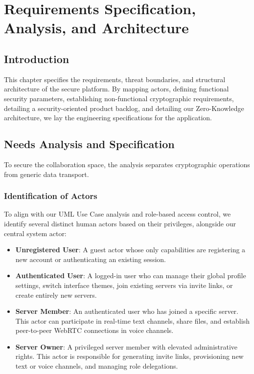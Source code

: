 
\chapter{Requirements Specification, Analysis, and Architecture}
\label{ch:chapter2}

\section{Introduction}
This chapter specifies the requirements, threat boundaries, and structural architecture of the secure platform. By mapping actors, defining functional security parameters, establishing non-functional cryptographic requirements, detailing a security-oriented product backlog, and detailing our Zero-Knowledge architecture, we lay the engineering specifications for the application.

\section{Needs Analysis and Specification}
To secure the collaboration space, the analysis separates cryptographic operations from generic data transport.

\subsection{Identification of Actors}
To align with our UML Use Case analysis and role-based access control, we identify several distinct human actors based on their privileges, alongside our central system actor:
\begin{itemize}
    \item \textbf{Unregistered User}: A guest actor whose only capabilities are registering a new account or authenticating an existing session.
    \item \textbf{Authenticated User}: A logged-in user who can manage their global profile settings, switch interface themes, join existing servers via invite links, or create entirely new servers.
    \item \textbf{Server Member}: An authenticated user who has joined a specific server. This actor can participate in real-time text channels, share files, and establish peer-to-peer WebRTC connections in voice channels.
    \item \textbf{Server Owner}: A privileged server member with elevated administrative rights. This actor is responsible for generating invite links, provisioning new text or voice channels, and managing role delegations.
\end{itemize}


